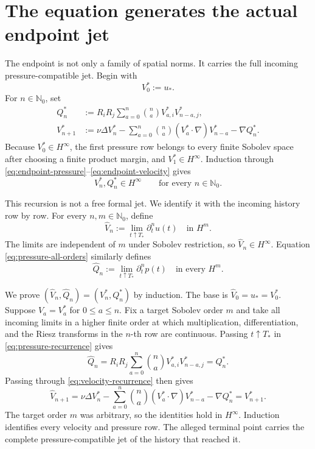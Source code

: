\documentclass[11pt,letterpaper]{article}
\theoremstyle{definition}
\theoremstyle{remark}
\newcommand{\Nzero}{\mathbb N_0}
\begin{document}
\section{The equation generates the actual endpoint jet}

The endpoint is not only a family of spatial norms.  It carries the full
incoming pressure-compatible jet.  Begin with
\[
V_0^*:=u_*.
\]
For \(n\in\Nzero\), set
\begin{align}
Q_n^*
&:=R_iR_j\sum_{a=0}^{n}\binom{n}{a}V_{a,i}^*V_{n-a,j}^*,
\label{eq:endpoint-pressure}\\
V_{n+1}^*
&:=\nu\Delta V_n^*
-\sum_{a=0}^{n}\binom{n}{a}(V_a^*\cdot\nabla)V_{n-a}^*
-\nabla Q_n^*.
\label{eq:endpoint-velocity}
\end{align}
Because \(V_0^*\in H^\infty\), the first pressure row belongs to every finite
Sobolev space after choosing a finite product margin, and
\(V_1^*\in H^\infty\).  Induction through
\eqref{eq:endpoint-pressure}--\eqref{eq:endpoint-velocity} gives
\begin{equation}
V_n^*,Q_n^*\in H^\infty
\qquad\text{for every }n\in\Nzero.
\label{eq:endpoint-jet}
\end{equation}

This recursion is not a free formal jet.  We identify it with the incoming
history row by row.  For every \(n,m\in\Nzero\), define
\[
\widehat V_n
:=\lim_{t\uparrow T_*}\partial_t^n u(t)
\quad\text{in }H^m.
\]
The limits are independent of \(m\) under Sobolev restriction, so
\(\widehat V_n\in H^\infty\).  Equation
\eqref{eq:pressure-all-orders} similarly defines
\[
\widehat Q_n
:=\lim_{t\uparrow T_*}\partial_t^n p(t)
\quad\text{in every }H^m.
\]

We prove \((\widehat V_n,\widehat Q_n)=(V_n^*,Q_n^*)\) by induction.
The base is \(\widehat V_0=u_*=V_0^*\).  Suppose
\(\widehat V_a=V_a^*\) for \(0\le a\le n\).  Fix a target Sobolev order
\(m\) and take all incoming limits in a higher finite order at which
multiplication, differentiation, and the Riesz transforms in the \(n\)-th
row are continuous.  Passing \(t\uparrow T_*\) in
\eqref{eq:pressure-recurrence} gives
\[
\widehat Q_n
=R_iR_j\sum_{a=0}^{n}\binom{n}{a}
V_{a,i}^*V_{n-a,j}^*
=Q_n^*.
\]
Passing through \eqref{eq:velocity-recurrence} then gives
\[
\widehat V_{n+1}
=\nu\Delta V_n^*
-\sum_{a=0}^{n}\binom{n}{a}
(V_a^*\cdot\nabla)V_{n-a}^*
-\nabla Q_n^*
=V_{n+1}^*.
\]
The target order \(m\) was arbitrary, so the identities hold in
\(H^\infty\).  Induction identifies every velocity and pressure row.
The alleged terminal point carries the complete pressure-compatible jet of
the history that reached it.
\end{document}
